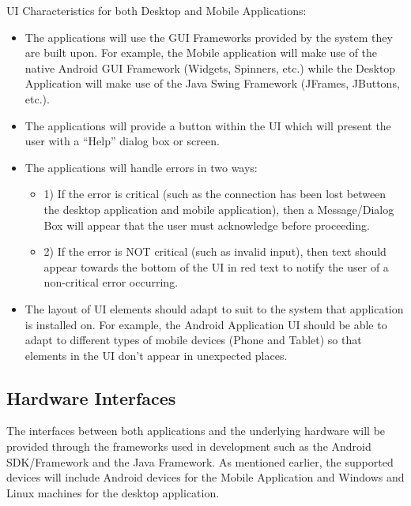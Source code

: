 \documentclass{article}
\begin{document}
UI Characteristics for both Desktop and Mobile Applications:
\begin{itemize}
\item The applications will use the GUI Frameworks provided by the system they are built upon. For example, the Mobile application will make use of the native Android GUI Framework (Widgets, Spinners, etc.) while the Desktop Application will make use of the Java Swing Framework (JFrames, JButtons, etc.).
\item The applications will provide a button within the UI which will present the user with a “Help” dialog box or screen.
\item The applications will handle errors in two ways:
\begin{itemize}
\item 1) If the error is critical (such as the connection has been lost between the desktop application and mobile application), then a Message/Dialog Box will appear that the user must acknowledge before proceeding.
\item 2) If the error is NOT critical (such as invalid input), then text should appear towards the bottom of the UI in red text to notify the user of a non-critical error occurring.
\end{itemize}
\item The layout of UI elements should adapt to suit to the system that application is installed on. For example, the Android Application UI should be able to adapt to different types of mobile devices (Phone and Tablet) so that elements in the UI don’t appear in unexpected places.
\end{itemize}



\subsection{Hardware Interfaces}

The interfaces between both applications and the underlying hardware will be provided through the frameworks used in development such as the Android SDK/Framework and the Java Framework. As mentioned earlier, the supported devices will include Android devices for the Mobile Application and Windows and Linux machines for the desktop application. 
\end{document}
